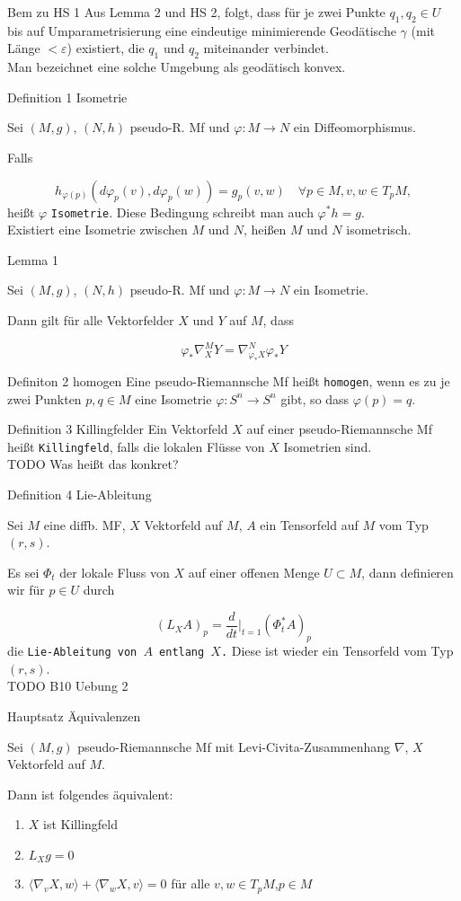 \documentclass[a6paper,11pt,grid=front]{kartei}
\newcommand{\fl}[1]{\begin{flushleft}
 #1 \end{flushleft}}
\newcommand{\eps}{\varepsilon}
\newcounter{def}
\newcounter{satz}
\begin{document}
\nonameyet
{Bem} {zu HS 1}
{
Aus Lemma 2 und HS 2, folgt, dass für je zwei Punkte $q_1, q_2 \in U$ bis auf
Umparametrisierung eine eindeutige minimierende Geodätische $\gamma$ (mit 
Länge $< \eps$) existiert, die $q_1$ und $q_2$ miteinander verbindet.
\\
Man bezeichnet eine solche Umgebung als geodätisch konvex.
}
{}


\nonameyet
{Definition 1} {Isometrie}
{
Sei $(M,g)$, $(N,h)$ pseudo-R. Mf und $\varphi : M \to N$ ein Diffeomorphismus.
\fl{Falls}
\[
h_{\varphi(p)}(d\varphi_p(v), d\varphi_p(w)) = g_p (v,w) 
\quad \forall p\in M, v,w \in T_pM,
\]
heißt $\varphi$ \texttt{Isometrie}. Diese Bedingung schreibt man auch
$\varphi^* h = g$.
\\
Existiert eine Isometrie zwischen $M$ und $N$, heißen $M$ und $N$ 
isometrisch.
}
{}

\nonameyet
{Lemma 1} {}
{
Sei $(M,g)$, $(N,h)$ pseudo-R. Mf und $\varphi : M \to N$ ein Isometrie. 
\fl{Dann gilt für alle Vektorfelder $X$ und $Y$ auf $M$,
dass }
\[
\varphi_*\nabla^M_X Y = \nabla^N_ {\varphi_* X} \varphi_* Y
\]
}
{}

\nonameyet
{Definiton 2} {homogen}
{
Eine pseudo-Riemannsche Mf heißt \texttt{homogen}, wenn es zu je zwei Punkten
$p,q \in M$ eine Isometrie $\varphi: S^n \to S^n$ gibt, so dass 
$\varphi(p) = q$.
}
{}

\nonameyet
{Definition 3} {Killingfelder}
{
Ein Vektorfeld $X$ auf einer pseudo-Riemannsche Mf heißt \texttt{Killingfeld},
falls die lokalen Flüsse von $X$ Isometrien sind.
\\
TODO Was heißt das konkret? 
}
{}

\nonameyet
{Definition 4} {Lie-Ableitung}
{
Sei $M$ eine diffb. MF, $X$ Vektorfeld auf $M$, $A$ ein Tensorfeld auf $M$ vom
Typ $(r,s)$.
\fl{Es sei $\Phi_t$ der lokale Fluss von $X$ auf einer offenen Menge 
$U \subset M$, dann definieren wir für $p \in U$ durch}
\[
(L_X A)_p = \frac{d}{dt}\bigg|_{t=1} (\Phi^* _t  A)_p
\]
die \texttt{Lie-Ableitung von $A$ entlang $X$.} 
Diese ist wieder ein Tensorfeld vom Typ $(r,s)$.
\\
TODO B10 Uebung 2
}
{}

\nonameyet
{Hauptsatz} {Äquivalenzen}
{
Sei $(M,g)$ pseudo-Riemannsche Mf mit Levi-Civita-Zusammenhang $\nabla$,
$X$ Vektorfeld auf $M$. 
\fl{Dann ist folgendes äquivalent:}
\begin{enumerate}[1.]
\item $X$ ist Killingfeld
\item $L_X g = 0$
\item $\langle \nabla_v X, w \rangle + \langle \nabla_w X, v\rangle = 0$
für alle $v,w \in T_pM$,$p\in M$
\end{enumerate}
}
{}
\end{document}
